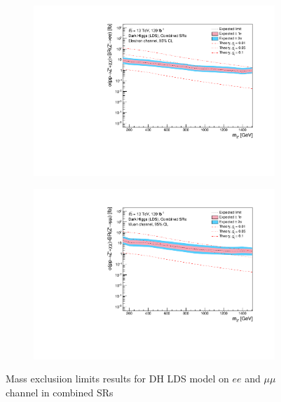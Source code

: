 \documentclass[12pt, a4paper]{book}
\begin{document}
\begin{figure}[!ht]
	\centering
	\begin{subfigure}[b]{0.49\textwidth}
      \centering
      \includegraphics[width=1\textwidth]{Limits/Model_independent/DH_LDS/mass_exclusion_ee.pdf}
   \end{subfigure}
   \hfill
   \begin{subfigure}[b]{0.49\textwidth}
      \centering
      \includegraphics[width=1\textwidth]{Limits/Model_independent/DH_LDS/mass_exclusion_uu.pdf}
   \end{subfigure}
   \caption{Mass exclusiion limits results for DH LDS model on $ee$ and $\mu\mu$ channel in combined SRs}\label{fig:DH_LDS_me_comb}
\end{figure}

\clearpage
\end{document}
